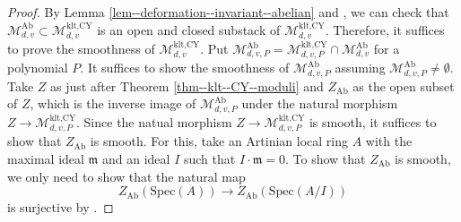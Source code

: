 \documentclass[12pt,twoside]{amsart}
\theoremstyle{definition}
\begin{document}
\begin{proof}
By Lemma \ref{lem--deformation--invariant--abelian} and \cite[Corollary 2]{kawamata-chara}, we can check that $\mathcal{M}_{d,v}^{\mathrm{Ab}}\subset\mathcal{M}^{\text{klt,CY}}_{d,v}$ is an open and closed substack of $\mathcal{M}^{\text{klt,CY}}_{d,v}$.
Therefore, it suffices to prove the smoothness of $\mathcal{M}^{\text{klt,CY}}_{d,v}$. 
    Put $\mathcal{M}^\mathrm{Ab}_{d,v,P}=\mathcal{M}^{\text{klt,CY}}_{d,v,P}\cap\mathcal{M}^\mathrm{Ab}_{d,v}$ for a polynomial $P$.
    It suffices to show the smoothness of $\mathcal{M}^\mathrm{Ab}_{d,v,P}$ assuming $\mathcal{M}^\mathrm{Ab}_{d,v,P}\ne\emptyset$. 
    Take $Z$ as just after Theorem \ref{thm--klt--CY--moduli} and $Z_{\mathrm{Ab}}$ as the open subset of $Z$, which is the inverse image of $\mathcal{M}^\mathrm{Ab}_{d,v,P}$ under the natural morphism $Z\to\mathcal{M}^{\text{klt,CY}}_{d,v,P}$.
    Since the natual morphism $Z\to\mathcal{M}^{\text{klt,CY}}_{d,v,P}$ is smooth, it suffices to show that $Z_{\mathrm{Ab}}$ is smooth.
    For this, take an Artinian local ring $A$ with the maximal ideal $\mathfrak{m}$ and an ideal $I$ such that $I\cdot \mathfrak{m}=0$.
    To show that $Z_{\mathrm{Ab}}$ is smooth, we only need to show that the natural map
    \[
    Z_{\mathrm{Ab}}(\mathrm{Spec}(A))\to Z_{\mathrm{Ab}}(\mathrm{Spec}(A/I))
    \]
    is surjective by \cite[Theorem 3.1 (iii)]{SGA}.


\end{proof}
\end{document}
